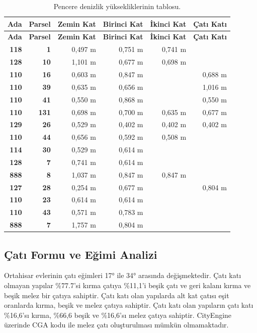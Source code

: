 \documentclass[12pt,turkish,a4paperpaper,]{report}
\begin{document}
\begin{longtable}[]{@{}rrrrrr@{}}
\caption{Pencere denizlik yüksekliklerinin tablosu.}\tabularnewline
\toprule
\textbf{Ada} & \textbf{Parsel} & \textbf{Zemin Kat} & \textbf{Birinci
Kat} & \textbf{İkinci Kat} & \textbf{Çatı Katı}\tabularnewline
\midrule
\endfirsthead
\toprule
\textbf{Ada} & \textbf{Parsel} & \textbf{Zemin Kat} & \textbf{Birinci
Kat} & \textbf{İkinci Kat} & \textbf{Çatı Katı}\tabularnewline
\midrule
\endhead
\textbf{118} & \textbf{1} & 0,497 m & 0,751 m & 0,741 m &\tabularnewline
\textbf{128} & \textbf{10} & 1,101 m & 0,677 m & 0,698 m
&\tabularnewline
\textbf{110} & \textbf{16} & 0,603 m & 0,847 m & & 0,688
m\tabularnewline
\textbf{110} & \textbf{39} & 0,635 m & 0,656 m & & 1,016
m\tabularnewline
\textbf{110} & \textbf{41} & 0,550 m & 0,868 m & & 0,550
m\tabularnewline
\textbf{110} & \textbf{131} & 0,698 m & 0,700 m & 0,635 m & 0,677
m\tabularnewline
\textbf{129} & \textbf{26} & 0,529 m & 0,402 m & 0,402 m & 0,402
m\tabularnewline
\textbf{110} & \textbf{44} & 0,656 m & 0,592 m & 0,508 m
&\tabularnewline
\textbf{114} & \textbf{30} & 0,529 m & 0,614 m & &\tabularnewline
\textbf{128} & \textbf{7} & 0,741 m & 0,614 m & &\tabularnewline
\textbf{888} & \textbf{8} & 1,037 m & 0,847 m & 0,847 m &\tabularnewline
\textbf{127} & \textbf{28} & 0,254 m & 0,677 m & & 0,804
m\tabularnewline
\textbf{110} & \textbf{23} & 0,614 m & 0,614 m & &\tabularnewline
\textbf{110} & \textbf{43} & 0,571 m & 0,783 m & &\tabularnewline
\textbf{888} & \textbf{7} & 1,757 m & 0,804 m & &\tabularnewline
\bottomrule
\end{longtable}

\hypertarget{uxe7atux131-formu-ve-eux11fimi-analizi}{%
\subsection{Çatı Formu ve Eğimi
Analizi}\label{uxe7atux131-formu-ve-eux11fimi-analizi}}

Ortahisar evlerinin çatı eğimleri 17° ile 34° arasında değişmektedir.
Çatı katı olmayan yapılar \%77.7'si kırma çatıya \%11,1'i beşik çatı ve
geri kalanı kırma ve beşik melez bir çatıya sahiptir. Çatı katı olan
yapılarda alt kat çatısı eşit oranlarda kırma, beşik ve melez çatıya
sahiptir. Çatı katı olan yapıların çatı katı \%16,6'sı kırma, \%66,6
beşik ve \%16,6'sı melez çatıya sahiptir. CityEngine üzerinde CGA kodu
ile melez çatı oluşturulması mümkün olmamaktadır.
\end{document}
